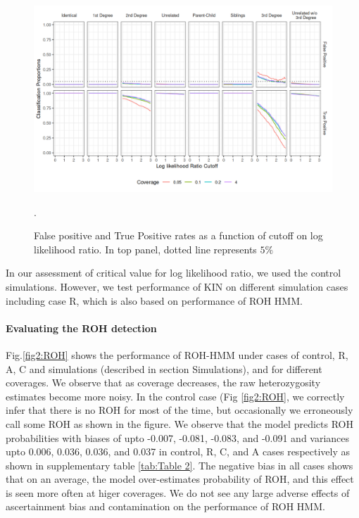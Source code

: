 \documentclass[12pt, letterpaper]{article}
\begin{document}
\begin{figure}[h!]
    \includegraphics[width=16cm]{plots/plotimg/contam0_inbred0_model_performance_allroc_asc0_plot.png}
    \centering
    \caption{False positive and True Positive rates as a function of cutoff on log likelihood ratio. In top panel, dotted line represents $5\%$}.
    \label{fig3:cutoff}
\end{figure}

In our assessment of critical value for log likelihood ratio, we used the control simulations. However, we test performance of KIN on different simulation cases including case R, which is also based on performance of ROH HMM.

\paragraph{Evaluating the ROH detection}
 Fig.\ref{fig2:ROH} shows the performance of ROH-HMM under cases of control, R, A, C and simulations (described in section Simulations), and for different coverages. We observe that as coverage decreases, the raw heterozygosity estimates become more noisy. In the control case (Fig \ref{fig2:ROH}, we correctly infer that there is no ROH for most of the time, but occasionally we erroneously call some ROH as shown in the figure. We observe that the model predicts ROH probabilities with biases of upto -0.007, -0.081, -0.083, and -0.091 and variances upto 0.006, 0.036, 0.036, and 0.037 in control, R, C, and A cases respectively as shown in supplementary table \ref{tab:Table 2}. The negative bias in all cases shows that on an average, the model over-estimates probability of ROH, and this effect is seen more often at higer coverages. We do not see any large adverse effects of ascertainment bias and contamination on the performance of ROH HMM.
\end{document}
